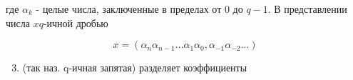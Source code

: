 \documentclass[10pt]{article}
\begin{document}
где $\alpha_{k}$ - целые числа, заключенные в пределах от 0 до $q-1$. В представлении числа $x q$-ичной дробью



\[

x=\left(\alpha_{n} \alpha_{n-1} \ldots \alpha_{1} \alpha_{0}, \alpha_{-1} \alpha_{-2} \ldots\right)

\]



\begin{enumerate}

  \setcounter{enumi}{2}

  \item (так наз. q-ичная запятая) разделяет коэффициенты

\end{enumerate}
\end{document}
